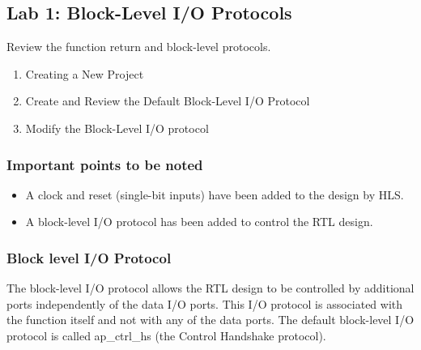 \subsection{Lab 1: Block-Level I/O Protocols}
Review the function return and block-level protocols. 


\begin{enumerate}[label=Step \arabic*:]
    \item Creating a New Project
    \item Create and Review the Default Block-Level I/O Protocol 
    \item Modify the Block-Level I/O protocol
\end{enumerate}

\subsubsection{Important points to be noted}
\begin{itemize}
    \item A clock and reset (single-bit inputs) have been added to the design by HLS.
    \item A block-level I/O protocol has been added to control the RTL design.
\end{itemize}

\subsubsection{Block level I/O Protocol}
The block-level I/O protocol allows the RTL design to be controlled by additional ports independently of the data I/O ports. This I/O protocol is associated with the function itself and not with any of the data ports. The default block-level I/O protocol is called ap\_ctrl\_hs (the Control Handshake protocol).

